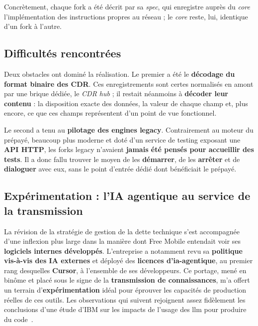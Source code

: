 Concrètement, chaque fork a été décrit par sa \emph{spec}, qui enregistre auprès
du \emph{core} l'implémentation des instructions propres au réseau ; le
\emph{core} reste, lui, identique d'un fork à l'autre.

\subsection{Difficultés rencontrées}
Deux obstacles ont dominé la réalisation. Le premier a été le \textbf{décodage du
format binaire des CDR}. Ces enregistrements sont certes normalisés en amont par
une brique dédiée, le \emph{CDR hub} ; il restait néanmoins à \textbf{décoder leur
contenu} : la disposition exacte des données, la valeur de chaque champ et, plus
encore, ce que ces champs représentent d'un point de vue fonctionnel.

Le second a tenu au \textbf{pilotage des engines legacy}. Contrairement au moteur
du prépayé, beaucoup plus moderne et doté d'un service de testing exposant une
\textbf{API HTTP}, les forks legacy n'avaient \textbf{jamais été pensés pour
accueillir des tests}. Il a donc fallu trouver le moyen de les \textbf{démarrer},
de les \textbf{arrêter} et de \textbf{dialoguer} avec eux, sans le point d'entrée
dédié dont bénéficiait le prépayé.

\subsection{Expérimentation : l'IA agentique au service de la transmission}
La révision de la stratégie de gestion de la dette technique s'est accompagnée
d'une inflexion plus large dans la manière dont Free Mobile entendait voir ses
\textbf{logiciels internes développés}. L'entreprise a notamment revu sa
\textbf{politique vis-à-vis des IA externes} et déployé des \textbf{licences
d'\gls{ia-agentique}}, au premier rang desquelles \textbf{Cursor}, à
l'ensemble de ses développeurs. Ce portage, mené en binôme et placé sous le
signe de la \textbf{transmission de connaissances}, m'a offert un terrain
d'\textbf{expérimentation} idéal pour éprouver les capacités de production
réelles de ces outils. Les observations qui suivent rejoignent assez fidèlement
les conclusions d'une étude d'IBM sur les impacts de l'usage des \gls{llm} pour
produire du code~\cite{ibm-llm}.

